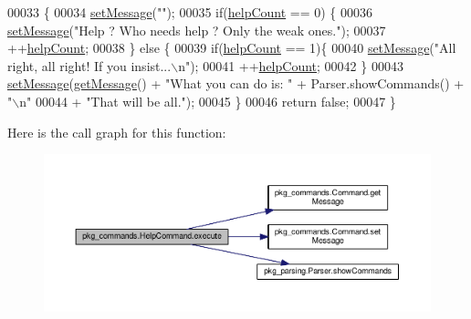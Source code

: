 \begin{DoxyCode}
00033                                           \{
00034         \hyperlink{classpkg__commands_1_1Command_ae210ff216fe908b111ba1c988a963d13}{setMessage}(\textcolor{stringliteral}{""});
00035         \textcolor{keywordflow}{if}(\hyperlink{classpkg__commands_1_1HelpCommand_a1f83dd0f92e63803f29ce29485903526}{helpCount} == 0) \{
00036             \hyperlink{classpkg__commands_1_1Command_ae210ff216fe908b111ba1c988a963d13}{setMessage}(\textcolor{stringliteral}{"Help ? Who needs help ? Only the weak ones."});
00037             ++\hyperlink{classpkg__commands_1_1HelpCommand_a1f83dd0f92e63803f29ce29485903526}{helpCount};
00038         \} \textcolor{keywordflow}{else} \{
00039             \textcolor{keywordflow}{if}(\hyperlink{classpkg__commands_1_1HelpCommand_a1f83dd0f92e63803f29ce29485903526}{helpCount} == 1)\{
00040                 \hyperlink{classpkg__commands_1_1Command_ae210ff216fe908b111ba1c988a963d13}{setMessage}(\textcolor{stringliteral}{"All right, all right! If you insist...\(\backslash\)n"});
00041                 ++\hyperlink{classpkg__commands_1_1HelpCommand_a1f83dd0f92e63803f29ce29485903526}{helpCount};
00042             \}
00043             \hyperlink{classpkg__commands_1_1Command_ae210ff216fe908b111ba1c988a963d13}{setMessage}(\hyperlink{classpkg__commands_1_1Command_ac2a42e2bab264821892daefaf9a18b6c}{getMessage}() + \textcolor{stringliteral}{"What you can do is: "} + Parser.showCommands() + \textcolor{stringliteral}{
      "\(\backslash\)n"}
00044                     + \textcolor{stringliteral}{"That will be all."});
00045         \}
00046         \textcolor{keywordflow}{return} \textcolor{keyword}{false};
00047     \}
\end{DoxyCode}


Here is the call graph for this function\-:\nopagebreak
\begin{figure}[H]
\begin{center}
\leavevmode
\includegraphics[width=350pt]{classpkg__commands_1_1HelpCommand_a332d3e57539dfc82f8c539f8b3e24dd6_cgraph}
\end{center}
\end{figure}




